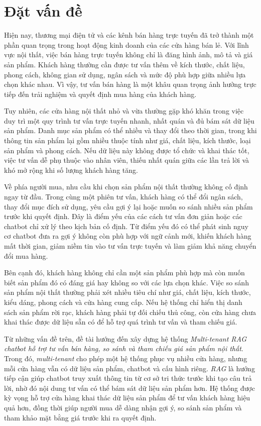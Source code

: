 \documentclass[../DoAn.tex]{subfiles}
\begin{document}
\section{Đặt vấn đề}
\label{section:1.1}

Hiện nay, thương mại điện tử và các kênh bán hàng trực tuyến đã trở thành một phần quan trọng trong hoạt động kinh doanh của các cửa hàng bán lẻ. Với lĩnh vực nội thất, việc bán hàng trực tuyến không chỉ là đăng hình ảnh, mô tả và giá sản phẩm. Khách hàng thường cần được tư vấn thêm về kích thước, chất liệu, phong cách, không gian sử dụng, ngân sách và mức độ phù hợp giữa nhiều lựa chọn khác nhau. Vì vậy, tư vấn bán hàng là một khâu quan trọng ảnh hưởng trực tiếp đến trải nghiệm và quyết định mua hàng của khách hàng.

Tuy nhiên, các cửa hàng nội thất nhỏ và vừa thường gặp khó khăn trong việc duy trì một quy trình tư vấn trực tuyến nhanh, nhất quán và đủ bám sát dữ liệu sản phẩm. Danh mục sản phẩm có thể nhiều và thay đổi theo thời gian, trong khi thông tin sản phẩm lại gồm nhiều thuộc tính như giá, chất liệu, kích thước, loại sản phẩm và phong cách. Nếu dữ liệu này không được tổ chức và khai thác tốt, việc tư vấn dễ phụ thuộc vào nhân viên, thiếu nhất quán giữa các lần trả lời và khó mở rộng khi số lượng khách hàng tăng.

Về phía người mua, nhu cầu khi chọn sản phẩm nội thất thường không cố định ngay từ đầu. Trong cùng một phiên tư vấn, khách hàng có thể đổi ngân sách, thay đổi mục đích sử dụng, yêu cầu gợi ý lại hoặc muốn so sánh nhiều sản phẩm trước khi quyết định. Đây là điểm yếu của các cách tư vấn đơn giản hoặc các chatbot chỉ xử lý theo kịch bản cố định. Từ điểm yếu đó có thể phát sinh nguy cơ chatbot đưa ra gợi ý không còn phù hợp với ngữ cảnh mới, khiến khách hàng mất thời gian, giảm niềm tin vào tư vấn trực tuyến và làm giảm khả năng chuyển đổi mua hàng.

Bên cạnh đó, khách hàng không chỉ cần một sản phẩm phù hợp mà còn muốn biết sản phẩm đó có đáng giá hay không so với các lựa chọn khác. Việc so sánh sản phẩm nội thất thường phải xét nhiều tiêu chí như giá, chất liệu, kích thước, kiểu dáng, phong cách và cửa hàng cung cấp. Nếu hệ thống chỉ hiển thị danh sách sản phẩm rời rạc, khách hàng phải tự đối chiếu thủ công, còn cửa hàng chưa khai thác được dữ liệu sẵn có để hỗ trợ quá trình tư vấn và tham chiếu giá.

Từ những vấn đề trên, đề tài hướng đến xây dựng hệ thống \textit{Multi-tenant RAG chatbot hỗ trợ tư vấn bán hàng, so sánh và tham chiếu giá sản phẩm nội thất}. Trong đó, \textit{multi-tenant} cho phép một hệ thống phục vụ nhiều cửa hàng, nhưng mỗi cửa hàng vẫn có dữ liệu sản phẩm, chatbot và cấu hình riêng. \textit{RAG} là hướng tiếp cận giúp chatbot truy xuất thông tin từ cơ sở tri thức trước khi tạo câu trả lời, nhờ đó nội dung tư vấn có thể bám sát dữ liệu sản phẩm hơn. Hệ thống được kỳ vọng hỗ trợ cửa hàng khai thác dữ liệu sản phẩm để tư vấn khách hàng hiệu quả hơn, đồng thời giúp người mua dễ dàng nhận gợi ý, so sánh sản phẩm và tham khảo mặt bằng giá trước khi ra quyết định.
\end{document}
